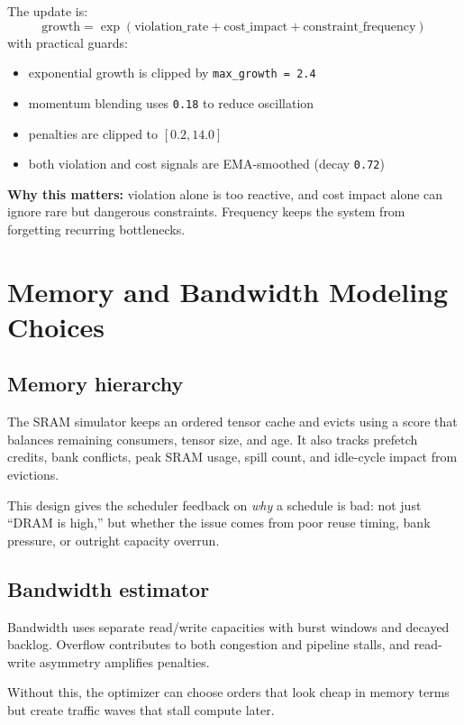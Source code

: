 \documentclass[11pt]{article}
\begin{document}
The update is:
\[
\text{growth} = \exp(\text{violation\_rate} + \text{cost\_impact} + \text{constraint\_frequency})
\]
with practical guards:
\begin{itemize}
    \item exponential growth is clipped by \texttt{max\_growth = 2.4}
    \item momentum blending uses \texttt{0.18} to reduce oscillation
    \item penalties are clipped to \([0.2, 14.0]\)
    \item both violation and cost signals are EMA-smoothed (decay \texttt{0.72})
\end{itemize}

\textbf{Why this matters:} violation alone is too reactive, and cost impact alone can ignore rare but dangerous constraints. Frequency keeps the system from forgetting recurring bottlenecks.

\section{Memory and Bandwidth Modeling Choices}
\subsection*{Memory hierarchy}
The SRAM simulator keeps an ordered tensor cache and evicts using a score that balances remaining consumers, tensor size, and age. It also tracks prefetch credits, bank conflicts, peak SRAM usage, spill count, and idle-cycle impact from evictions.

This design gives the scheduler feedback on \emph{why} a schedule is bad: not just ``DRAM is high,'' but whether the issue comes from poor reuse timing, bank pressure, or outright capacity overrun.

\subsection*{Bandwidth estimator}
Bandwidth uses separate read/write capacities with burst windows and decayed backlog. Overflow contributes to both congestion and pipeline stalls, and read-write asymmetry amplifies penalties.

Without this, the optimizer can choose orders that look cheap in memory terms but create traffic waves that stall compute later.
\end{document}
